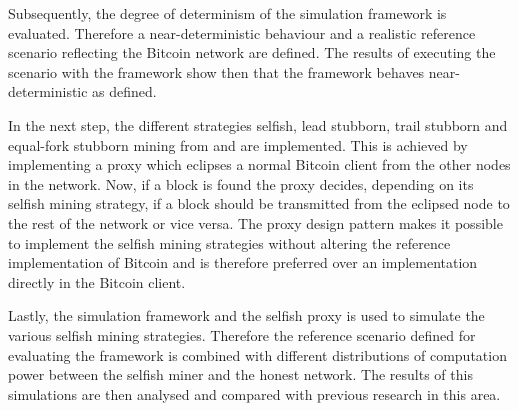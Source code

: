 Subsequently, the degree of determinism of the simulation framework is evaluated.
Therefore a near-deterministic behaviour and a realistic reference scenario reflecting the Bitcoin network are defined.
The results of executing the scenario with the framework show then that the framework behaves near-deterministic as defined.

In the next step, the different strategies selfish, lead stubborn, trail stubborn and equal-fork stubborn mining from \cite{nayak2016stubborn} and \cite{eyal2014majority} are implemented.
This is achieved by implementing a proxy which eclipses a normal Bitcoin client from the other nodes in the network.
Now, if a block is found the proxy decides, depending on its selfish mining strategy, if a block should be transmitted from the eclipsed node to the rest of the network or vice versa.
The proxy design pattern makes it possible to implement the selfish mining strategies without altering the reference implementation of Bitcoin and is therefore preferred over an implementation directly in the Bitcoin client.

Lastly, the simulation framework and the selfish proxy is used to simulate the various selfish mining strategies.
Therefore the reference scenario defined for evaluating the framework is combined with different distributions of computation power between the selfish miner and the honest network.
The results of this simulations are then analysed and compared with previous research in this area.
